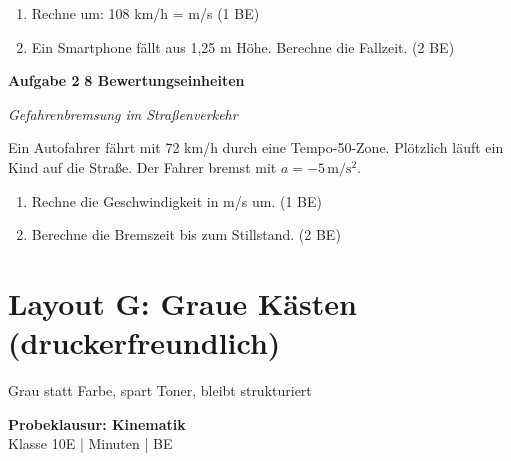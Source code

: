 \documentclass[11pt,a4paper]{article}
\begin{document}
\vspace{0.2cm}
\begin{enumerate}
\item[1.1] Rechne um: 108 km/h = \underline{\hspace{2cm}} m/s \hfill (1 BE)

\vspace{0.3cm}
\item[1.2] Ein Smartphone fällt aus 1,25 m Höhe. Berechne die Fallzeit. \hfill (2 BE)
\end{enumerate}

\vspace{0.8cm}

\noindent\textbf{Aufgabe 2} \hfill \textbf{8 Bewertungseinheiten}

\vspace{0.2cm}
\textit{Gefahrenbremsung im Straßenverkehr}

\vspace{0.2cm}
Ein Autofahrer fährt mit 72 km/h durch eine Tempo-50-Zone. Plötzlich läuft ein Kind auf die Straße. Der Fahrer bremst mit $a = -5\,\mathrm{m/s^2}$.

\vspace{0.2cm}
\begin{enumerate}
\item[2.1] Rechne die Geschwindigkeit in m/s um. \hfill (1 BE)

\vspace{0.3cm}
\item[2.2] Berechne die Bremszeit bis zum Stillstand. \hfill (2 BE)
\end{enumerate}

\vspace{1cm}

\newpage
\section*{Layout G: Graue Kästen (druckerfreundlich)}
\vspace{-0.3cm}
{\small Grau statt Farbe, spart Toner, bleibt strukturiert}

\vspace{0.5cm}

\begin{tcolorbox}[
    colback=black!8,
    colframe=black!40,
    boxrule=0.5pt,
    arc=0pt,
    left=5pt, right=5pt, top=5pt, bottom=5pt
]
\centering
{\Large\bfseries Probeklausur: Kinematik}\\[0.2cm]
{\small Klasse 10E \quad| Minuten \quad| BE}
\end{tcolorbox}
\end{document}

